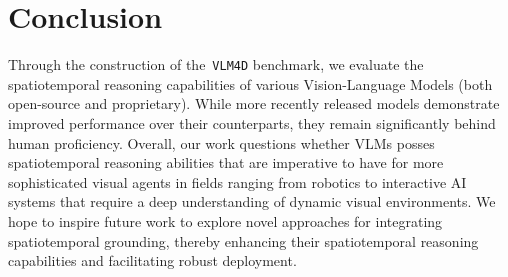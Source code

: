 \section{Conclusion}
Through the construction of the~\texttt{VLM4D} benchmark, we evaluate the spatiotemporal reasoning capabilities of various Vision-Language Models (both open-source and proprietary). While more recently released models demonstrate improved performance over their counterparts, they remain significantly behind human proficiency. Overall, our work questions whether VLMs posses spatiotemporal reasoning abilities that are imperative to have for more sophisticated visual agents in fields ranging from robotics to interactive AI systems that require a deep understanding of dynamic visual environments. We hope to inspire future work to explore novel approaches for integrating spatiotemporal grounding, thereby enhancing their spatiotemporal reasoning capabilities and facilitating robust deployment. 
\newpage